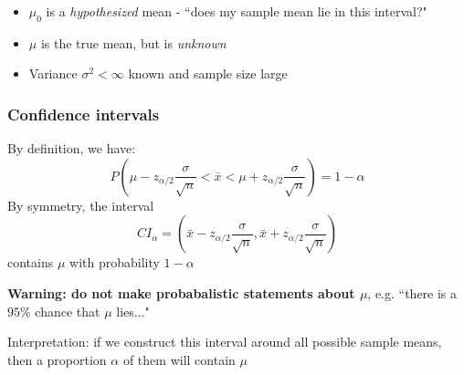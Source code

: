 \documentclass[t,8pt]{beamer}%
\begin{document}
\begin{frame}
\begin{center}
\end{center}
\begin{itemize}
    \item $\mu_0$ is a {\it hypothesized} mean - ``does my sample mean lie in this interval?"
    \item $\mu$ is the true mean, but is {\it unknown}
    \item Variance $\sigma^2<\infty$ known and sample size large
\end{itemize}
\end{frame}

\begin{frame}
	\frametitle{Confidence intervals}
        By definition, we have:
        $$P\left(\mu-z_{\alpha/2}\frac{\sigma}{\sqrt n}<\bar x <\mu+z_{\alpha/2}\frac{\sigma}{\sqrt n}\right)=1-\alpha$$
        By symmetry, the interval
        $$CI_{\alpha}=\left(\bar x-z_{\alpha/2}\frac{\sigma}{\sqrt n},\bar x+z_{\alpha/2}\frac{\sigma}{\sqrt n}\right)$$
        contains $\mu$ with probability $1-\alpha$
     \par
     {\bf Warning: do not make probabalistic statements about $\mu$}, e.g. ``there is a $95\%$ chance that $\mu$ lies..." \par
     Interpretation: if we construct this interval around all possible sample means, then a proportion $\alpha$ of them will contain $\mu$ \par
\end{frame}
\end{document}
